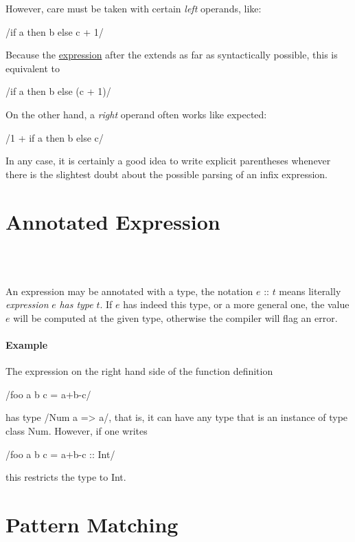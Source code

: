 However, care must be taken with certain \emph{left} operands, like:

\exq/if a then b else c   + 1/

Because the \hyperref[annex]{expression} after the  extends as far as syntactically possible, this is equivalent to

\exq/if a then b else (c + 1)/

On the other hand, a \emph{right} operand often works like expected:

\exq/1 + if a then b else c/

In any case, it is certainly a good idea to write explicit parentheses whenever there is the slightest doubt about the possible parsing of an infix expression. 

\section{Annotated Expression} \label{annex}

\begin{flushleft}
  \sym{::}  \alt{} \\
  \alt{}  \alt{}  \alt{}  \alt{}  \\
\end{flushleft}

An expression may be annotated with a type, the notation $e$ :: $t$ means literally \emph{expression} $e$ \emph{has type} $t$. If $e$ has indeed this type, or a more general one, the value $e$ will be computed at the given type, otherwise the compiler will flag an error.

\paragraph{Example}
The expression on the right hand side of the function definition

\exq/foo a b c = a+b-c/

has type 
\ex/Num a => a/, that is, it can have any type that is an instance of type class Num. However, if one writes

\exq/foo a b c = a+b-c :: Int/

this restricts the type to Int.



\section{Pattern Matching} \label{patternmatch}  

